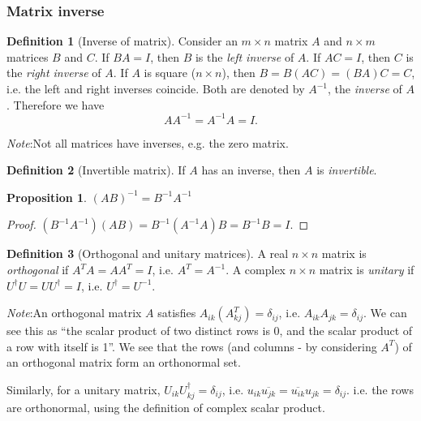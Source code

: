 \documentclass[a4paper]{article}
\theoremstyle{definition}
\newtheorem*{prop}{Proposition}
\newtheorem*{defi}{Definition}
\newcommand{\note}{\noindent \emph{Note}:\;}
\begin{document}
\subsubsection{Matrix inverse}

\begin{defi}[Inverse of matrix]
  Consider an $m\times n$ matrix $A$ and $n\times m$ matrices $B$ and $C$. If $BA = I$, then $B$ is the \emph{left inverse} of $A$. If $AC = I$, then $C$ is the \emph{right inverse} of $A$. If $A$ is square ($n\times n$), then $B = B(AC) = (BA)C = C$, i.e. the left and right inverses coincide. Both are denoted by $A^{-1}$, the \emph{inverse} of $A$. Therefore we have
\[
AA^{-1} = A^{-1}A = I.
\]
\end{defi}
\note Not all matrices have inverses, e.g. the zero matrix.
\begin{defi}[Invertible matrix]
  If $A$ has an inverse, then $A$ is \emph{invertible}.
\end{defi}

\begin{prop}
  $(AB)^{-1} = B^{-1}A^{-1}$
\end{prop}

\begin{proof}
  $(B^{-1}A^{-1})(AB) = B^{-1}(A^{-1}A)B = B^{-1}B = I$.
\end{proof}

\begin{defi}[Orthogonal and unitary matrices]
  A real $n\times n$ matrix is \emph{orthogonal} if $A^TA = AA^T = I$, i.e. $A^T = A^{-1}$. A complex $n\times n$ matrix is \emph{unitary} if $U^\dagger U = UU^\dagger = I$, i.e. $U^\dagger = U^{-1}$.
\end{defi}
\note An orthogonal matrix $A$ satisfies $A_{ik}(A^T_{kj}) = \delta_{ij}$, i.e. $A_{ik}A_{jk} = \delta_{ij}$. We can see this as ``the scalar product of two distinct rows is 0, and the scalar product of a row with itself is 1''. We see that the rows (and columns - by considering $A^T$) of an orthogonal matrix form an orthonormal set.

Similarly, for a unitary matrix, $U_{ik}U_{kj}^\dagger = \delta_{ij}$, i.e. $u_{ik}\overline{u_{jk}} = \overline{u_{ik}}u_{jk} =\delta_{ij}$. i.e. the rows are orthonormal, using the definition of complex scalar product.
\end{document}
